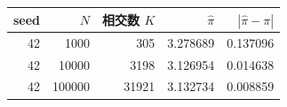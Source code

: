 \begin{tabular}{rrrrr}
\toprule
seed & $N$ & 相交数 $K$ & $\widehat{\pi}$ & $|\widehat{\pi}-\pi|$ \\
\midrule
42 & 1000 & 305 & 3.278689 & 0.137096 \\
42 & 10000 & 3198 & 3.126954 & 0.014638 \\
42 & 100000 & 31921 & 3.132734 & 0.008859 \\
\bottomrule
\end{tabular}

